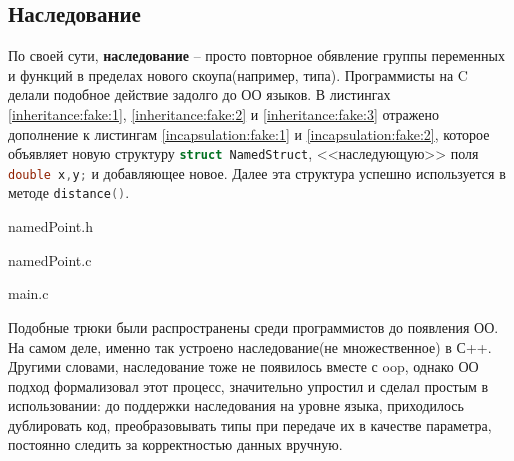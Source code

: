\subsection{Наследование}
\label{sec:inheritance}

По своей сути, \textbf{наследование} -- просто повторное обявление группы переменных и функций в пределах нового скоупа(например, типа). Программисты на C делали подобное действие задолго до ОО языков. В листингах \ref{inheritance:fake:1}, \ref{inheritance:fake:2} и \ref{inheritance:fake:3} отражено дополнение к листингам \ref{incapsulation:fake:1} и \ref{incapsulation:fake:2}, которое объявляет новую структуру \lstinline[language=C]{struct NamedStruct}, <<наследующую>> поля \lstinline[language=C]{double x,y;} и добавляющее новое. Далее эта структура успешно используется в методе \lstinline[language=C]{distance()}.

\begin{code}
	
   \caption{namedPoint.h}
   \label{inheritance:fake:1}
\end{code}

\begin{code}
	
   \caption{namedPoint.c}
   \label{inheritance:fake:2}
\end{code}

\begin{code}
	
   \caption{main.c}
   \label{inheritance:fake:3}
\end{code}

Подобные трюки были распространены среди программистов до появления ОО. На самом деле, именно так устроено наследование(не множественное) в С++. Другими словами, наследование тоже не появилось вместе с \gls{oop}, однако ОО подход формализовал этот процесс, значительно упростил и сделал простым в использовании: до поддержки наследования на уровне языка, приходилось дублировать код, преобразовывать типы при передаче их в качестве параметра, постоянно следить за корректностью данных вручную.